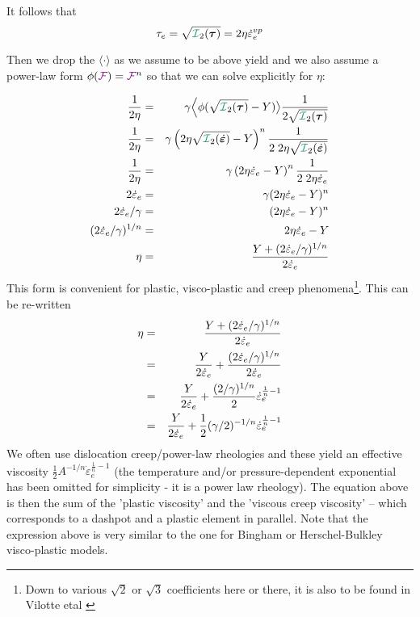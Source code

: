 It follows that 
\[
\tau_e =\sqrt{{\III}_2(\bm\tau)}=2\eta \dot{\varepsilon}_e^{vp}
\]

Then we drop the $\langle \cdot \rangle$ as we assume to be above yield and 
we also assume a power-law form $\phi({\color{violet}\cal F})={\color{violet}\cal F}^n$ so that 
we can solve explicitly for $\eta$:

\begin{eqnarray}
\frac{1}{2\eta} 
&=& \gamma \Big\langle \phi(\sqrt{{\III}_2(\bm \tau)}- Y)  \big\rangle 
\frac{1}{2 \sqrt{{\III}_2(\bm \tau)}} \nn\\
\frac{1}{2\eta} 
&=& \gamma \left(2\eta \sqrt{{\III}_2(\dot{\bm\varepsilon})}- Y\right)^n  \frac{1}{2 \; 2 \eta \sqrt{{\III}_2(\dot{\bm\varepsilon})}} \nn\\
\frac{1}{2\eta} 
&=& \gamma \left(2\eta \dot\varepsilon_e - Y\right)^n  \frac{1}{2 \; 2 \eta \dot\varepsilon_e } \nn\\
2 \dot\varepsilon_e
&=& \gamma (2\eta \dot\varepsilon_e - Y)^n  \nn\\
2 \dot\varepsilon_e / \gamma
&=&  (2\eta \dot\varepsilon_e - Y)^n  \nn\\
(2 \dot\varepsilon_e / \gamma)^{1/n}
&=&  2\eta \dot\varepsilon_e - Y \nn\\
\eta &=& \frac{ Y + (2 \dot\varepsilon_e / \gamma)^{1/n}}{2  \dot\varepsilon_e}
\end{eqnarray}
This form is convenient for plastic, visco-plastic and creep phenomena\footnote{Down 
to various $\sqrt{2}$ or $\sqrt{3}$ coefficients here or there, it 
is also to be found in Vilotte etal \cite{vidm82,vidm84,vimd86}}.
This can be re-written
\begin{eqnarray}
\eta 
&=& \frac{ Y + (2 \dot\varepsilon_e / \gamma)^{1/n}}{2  \dot\varepsilon_e} \nonumber\\
&=& \frac{ Y }{2  \dot\varepsilon_e}
+ \frac{ (2 \dot\varepsilon_e / \gamma)^{1/n}}{2  \dot\varepsilon_e} \nonumber\\
&=& \frac{ Y }{2  \dot\varepsilon_e}
+ \frac{ (2  / \gamma)^{1/n}}{2 }   \dot\varepsilon_e^{\frac1n-1} \nonumber\\
&=& \frac{ Y }{2  \dot\varepsilon_e}
+ \frac{1 }{2 } (\gamma/2)^{-1/n}  \dot\varepsilon_e^{\frac1n-1} 
\label{eq:zien75:a}
\end{eqnarray}
We often use dislocation creep/power-law rheologies and these yield an effective 
viscosity $\frac12 A^{-1/n} \dot\varepsilon_e^{\frac1n-1}$ (the temperature and/or 
pressure-dependent exponential has been omitted for simplicity - it is a power law rheology).
The equation above is then the sum of the 'plastic viscosity' and the 'viscous creep viscosity' 
-- which corresponds to a dashpot and a plastic element in parallel.
Note that the expression above is very similar to the one for Bingham or Herschel-Bulkley visco-plastic
models.


